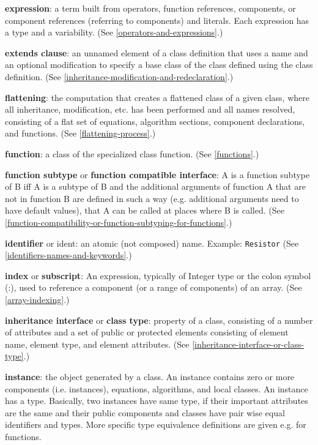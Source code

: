 \textbf{expression}: a term built from operators, function references,
components, or component references (referring to components) and
literals. Each expression has a type and a variability. (See \autoref{operators-and-expressions}.)

\textbf{extends clause}: an unnamed element of a class definition that
uses a name and an optional modification to specify a base class of the
class defined using the class definition. (See \autoref{inheritance-modification-and-redeclaration}.)

\textbf{flattening}: the computation that creates a flattened class of a
given class, where all inheritance, modification, etc. has been
performed and all names resolved, consisting of a flat set of equations,
algorithm sections, component declarations, and functions. (See \autoref{flattening-process}.)

\textbf{function}: a class of the specialized class function. (See \autoref{functions}.)

\textbf{function subtype} or \textbf{function compatible interface}: A
is a function subtype of B iff A is a subtype of B and the additional
arguments of function A that are not in function B are defined in such a
way (e.g. additional arguments need to have default values), that A can
be called at places where B is called. (See \autoref{function-compatibility-or-function-subtyping-for-functions}.)

\textbf{identifier} or ident: an atomic (not composed) name. Example:
\lstinline!Resistor! (See \autoref{identifiers-names-and-keywords}.)

\textbf{index} or \textbf{subscript}: An expression, typically of
Integer type or the colon symbol (:), used to reference a component (or
a range of components) of an array. (See \autoref{array-indexing}.)

\textbf{inheritance interface} or \textbf{class type}: property of a
class, consisting of a number of attributes and a set of public or
protected elements consisting of element name, element type, and element
attributes. (See \autoref{inheritance-interface-or-class-type}.)

\textbf{instance}: the object generated by a class. An instance contains
zero or more components (i.e. instances), equations, algorithms, and
local classes. An instance has a type. Basically, two instances have
same type, if their important attributes are the same and their public
components and classes have pair wise equal identifiers and types. More
specific type equivalence definitions are given e.g. for functions.


